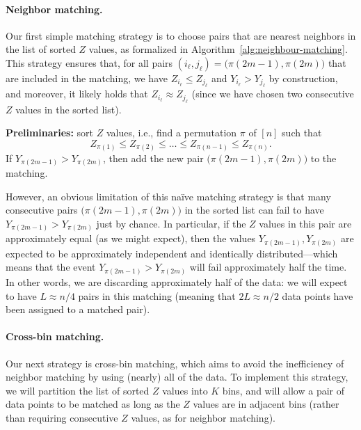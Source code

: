 \documentclass[12pt]{article}
\begin{document}
\paragraph{Neighbor matching.}
Our first simple matching strategy is to choose pairs that are nearest neighbors in the list of sorted $Z$ values, as formalized in Algorithm~\ref{alg:neighbour-matching}. This strategy ensures that, for all pairs $(i_\ell,j_\ell) = \bigl(\pi(2m-1),\pi(2m)\bigr)$ that are included in the matching, we have $Z_{i_\ell}\le Z_{j_\ell}$ and $Y_{i_\ell}>Y_{j_\ell}$ by construction, and moreover, it likely holds that $Z_{i_\ell}\approx Z_{j_\ell}$ (since we have chosen two consecutive $Z$ values in the sorted list). 
\begin{algorithm}[ht]
   \caption{Neighbor matching}
   \label{alg:neighbour-matching}
    \begin{algorithmic}
    \STATE \textbf{Preliminaries:} sort $Z$ values, i.e., find a permutation $\pi$  of $[n]$ such that
\[Z_{\pi(1)} \leq Z_{\pi(2)} \leq \dots \leq Z_{\pi(n-1)}\leq Z_{\pi(n)}.\]
\STATE If $Y_{\pi(2m-1)}>Y_{\pi(2m)}$, then add the new pair $\bigl(\pi(2m-1),\pi(2m)\bigr)$ to the matching.
\ENDFOR
\end{algorithmic}
\end{algorithm}
However, an obvious limitation of this na\"ive matching strategy is that many consecutive pairs $\bigl(\pi(2m-1),\pi(2m)\bigr)$ in the sorted list  can fail to have $Y_{\pi(2m-1)}>Y_{\pi(2m)}$ just by chance. In particular, if the $Z$ values in this pair are approximately equal (as we might expect), then the values $Y_{\pi(2m-1)},Y_{\pi(2m)}$ are expected to be approximately independent and identically distributed---which  means that the event $Y_{\pi(2m-1)}>Y_{\pi(2m)}$ will fail approximately half the time. In other words, we are discarding approximately half of the data: we will expect to have $L\approx n/4$ pairs in this matching (meaning that $2L\approx n/2$ data points have been assigned to a matched pair).


\paragraph{Cross-bin matching.}
Our next strategy is cross-bin matching, which aims to avoid the inefficiency of neighbor matching by using (nearly) all of the data. 
To implement this strategy, we will partition the list of sorted $Z$ values into $K$ bins, and will allow a pair of data points to be matched as long as the $Z$ values are in adjacent bins (rather than requiring consecutive $Z$ values, as for neighbor matching). 
\end{document}
